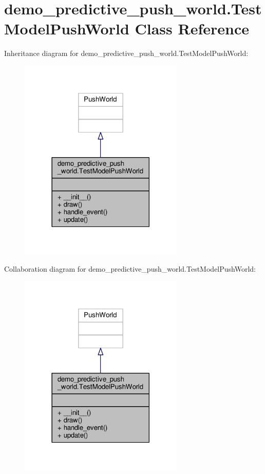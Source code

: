 \hypertarget{classdemo__predictive__push__world_1_1_test_model_push_world}{\section{demo\-\_\-predictive\-\_\-push\-\_\-world.\-Test\-Model\-Push\-World Class Reference}
\label{classdemo__predictive__push__world_1_1_test_model_push_world}
}


Inheritance diagram for demo\-\_\-predictive\-\_\-push\-\_\-world.\-Test\-Model\-Push\-World\-:\nopagebreak
\begin{figure}[H]
\begin{center}
\leavevmode
\includegraphics[width=222pt]{classdemo__predictive__push__world_1_1_test_model_push_world__inherit__graph}
\end{center}
\end{figure}


Collaboration diagram for demo\-\_\-predictive\-\_\-push\-\_\-world.\-Test\-Model\-Push\-World\-:\nopagebreak
\begin{figure}[H]
\begin{center}
\leavevmode
\includegraphics[width=222pt]{classdemo__predictive__push__world_1_1_test_model_push_world__coll__graph}
\end{center}
\end{figure}
